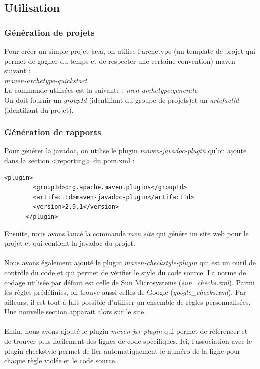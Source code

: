 \documentclass{article}
\begin{document}
\subsection{Utilisation}
\subsubsection{Génération de projets}
Pour créer un simple projet java, on utilise l'archetype (un template de projet qui permet de gagner du temps et de respecter une certaine convention) maven suivant : \\
\textit{maven-archetype-quickstart}. \\
La commande utilisées est la suivante : \textit{mvn archetype:generate} \\
On doit fournir un \textit{groupId} (identifiant du groupe de projets)et un \textit{artefactid} (identifiant du projet).\\
\subsubsection{Génération de rapports}
Pour générer la javadoc, on utilise le plugin \textit{maven-javadoc-plugin} qu'on ajoute dans la section <reporting> du pom.xml : 
\begin{verbatim}
<plugin>
        <groupId>org.apache.maven.plugins</groupId>
        <artifactId>maven-javadoc-plugin</artifactId>
        <version>2.9.1</version>
      </plugin>
\end{verbatim}
Ensuite, nous avons lancé la commande \textit{mvn site} qui génére un site web pour le projet et qui contient la javadoc du projet. \\\\
Nous avons également ajouté le plugin \textit{maven-checkstyle-plugin} qui est un outil de contrôle du code et qui permet de vérifier le style du code source. La norme de codage utilisée par défaut est celle de Sun Microsystems (\textit{sun\_checks.xml}). Parmi les règles prédéfinies, on trouve aussi celles de Google (\textit{google\_checks.xml}). Par ailleurs, il est tout à fait possible d'utiliser un ensemble de règles personnalisées. Une nouvelle section apparait alors sur le site. \\\\
Enfin, nous avons ajouté le plugin \textit{meven-jxr-plugin} qui permet de référencer et de trouver plus facilement des lignes de code spécifiques.	Ici, l'association avec le plugin checkstyle permet de lier automatiquement le numéro de la ligne pour chaque règle violée et le code source.
\end{document}

